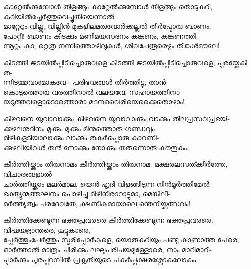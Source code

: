 \begin{enumerate}

\begin{slokam}{\VSr}{\Unk}{കാറ്റേൽക്കുമ്പോള്‍ തിളങ്ങും}
കാറ്റേൽക്കുമ്പോള്‍ തിളങ്ങും തൊടുകുറി, കുറിയിൽച്ചേർത്തുവെച്ചൂതിയെന്നാൽ\\
മാറ്റേറും വില്ലു, വില്ലിൻ മുകളിലമരുവോർക്കല്ലൽ തീർപ്പോരു ബാണം,\\
പോറ്റീ! ബാണം കിടക്കും മണിമയസദനം കങ്കണം, കങ്കണത്തി-\\
ന്നൂറ്റം കാ, റ്റെത്ര നന്നിത്തൊഴിലുകള്‍, ശിവപേരൂരെഴും തിങ്കള്‍മൗലേ!
\end{slokam}


\begin{slokam}{\VPv}{\UN}{കിടത്തി ജടയിൽപ്പിടിച്ചൊരുവളെ}
കിടത്തി ജടയിൽപ്പിടിച്ചൊരുവളെ, പ്പരയ്ക്കേകി ത-\\
ന്നിടത്തുവശമാകവേ - പരിഭവങ്ങള്‍ തീർത്തിട്ടു, താൻ\\
കൊടുത്തൊരു വരത്തിനാൽ വലയവേ, സഹായത്തിനാ-\\
യടുത്തവളൊടൊത്തൊരാ മദനവൈരിയെക്കൈതൊഴാം!
\end{slokam}




\begin{slokam}{\VHr}{\KKK}{കിഴവനെ യുവാവാക്കും}
കിഴവനെ യുവാവാക്കും വാക്കും തിലപ്രസവപ്രഭയ്‌-\\
ക്കഴലനുദിനം മൂക്കും മൂക്കും മിനുത്തൊരു ഗണ്ഡവും\\
മിഴികളടിയാലാക്കും ലാക്കും തകർപ്പൊരു കാറണി-\\
ക്കുഴലിയിവള്‍ തൻ നോക്കും നോക്കും തരുന്നൊരു കൗതുകം.
\end{slokam}



\begin{slokam}{\VSv}{\PCM}{കീര്‍ത്തിയ്ക്കാം തിരുനാമം}
കീര്‍ത്തിയ്ക്കാം തിരുനാമ, മക്ഷരലസത്ക്കീര്‍ത്തേ, വിചാരങ്ങളാല്‍\\
ചാര്‍ത്തിയ്ക്കാം മലര്‍മാല, യെന്‍ ഹൃദി വിളങ്ങീടുന്ന നിന്‍മൂര്‍ത്തിമേല്‍\\
ഭക്ത്യുന്മത്തഘനം പൊഴിച്ചു മിഴിനീരാറാട്ടുമാ, മെങ്കിലീ-\\
മര്‍ത്ത്യത്വം പരദേവതേ, ക്ഷണികമായാലെ,ന്തെനിയ്ക്കുത്സവം!
\end{slokam}




\begin{slokam}{\VSr}{\VKG}{കിർത്തിക്കേണ്ടുന്ന ഭക്തപ്രവരരെ}
കിർത്തിക്കേണ്ടുന്ന ഭക്തപ്രവരരെ, വിഷയഭ്രാന്തരെ, കൂട്ടുകാരെ,-\\
പ്പേർത്തുംപേർത്തും സ്മരിപ്പോർകളെ, യൊരുകുറിയും പണ്ടു കാണാത്ത പേരെ, \\
ഓർത്താൽ മാത്രം ചിരിക്കും ലഘുപരിചയമുള്ളോരെ, നാം മാറിമാറി-\\
പ്പാർക്കും പൂരപ്പറമ്പിൽ പ്രകൃതിയുടെ പകർപ്പക്ഷരശ്ലോകലോകം. 
\end{slokam}


\end{enumerate}

